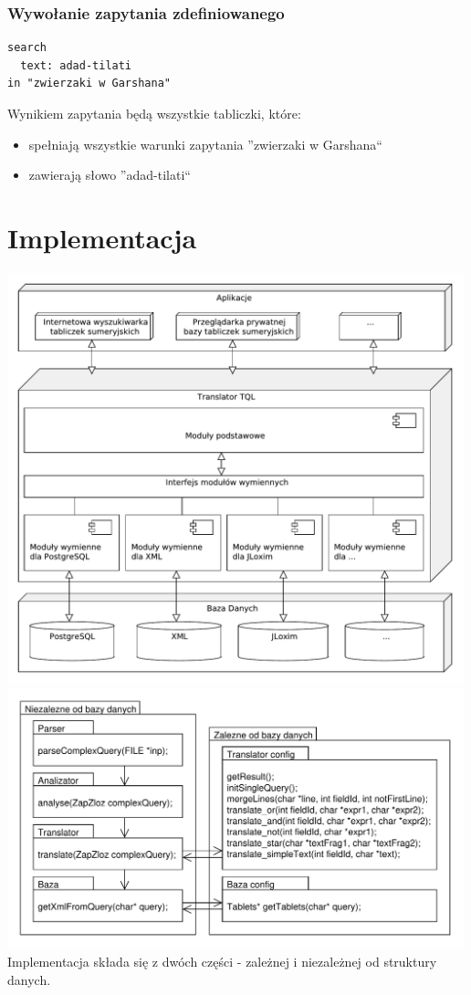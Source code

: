 \documentclass{pracamgr}
\begin{document}
\subsection{Wywołanie zapytania zdefiniowanego}
\begin{verbatim}
search
  text: adad-tilati
in "zwierzaki w Garshana"
\end{verbatim}
Wynikiem zapytania będą wszystkie tabliczki, które:
\begin{itemize}
 \item spełniają wszystkie warunki zapytania ''zwierzaki w Garshana``
\item zawierają słowo ''adad-tilati``
\end{itemize}

\chapter{Implementacja}
\includegraphics[width=500px]{diagramy/struktura.pdf}
\newpage 
\includegraphics[width=500px]{diagramy/pakiety.pdf}
Implementacja składa się z dwóch części - zależnej i niezależnej od struktury danych. 
\end{document}
